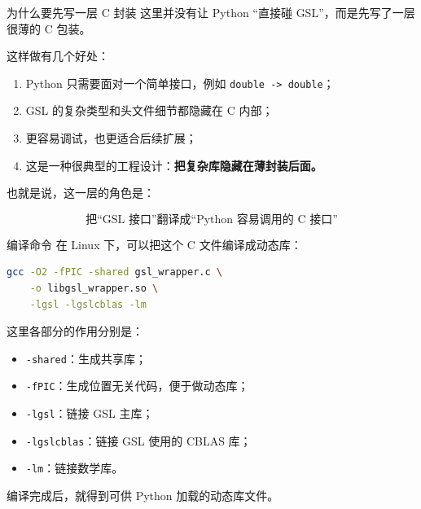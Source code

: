\documentclass[aspectratio=169,11pt]{ctexbeamer}
\begin{document}
\begin{frame}{为什么要先写一层 C 封装}
这里并没有让 Python “直接碰 GSL”，而是先写了一层很薄的 C 包装。

\vspace{0.5em}
这样做有几个好处：

\begin{enumerate}
  \item Python 只需要面对一个简单接口，例如 \texttt{double -> double}；
  \item GSL 的复杂类型和头文件细节都隐藏在 C 内部；
  \item 更容易调试，也更适合后续扩展；
  \item 这是一种很典型的工程设计：\textbf{把复杂库隐藏在薄封装后面。}
\end{enumerate}

\vspace{0.5em}
也就是说，这一层的角色是：

\[
\boxed{\text{把“GSL 接口”翻译成“Python 容易调用的 C 接口”}}
\]
\end{frame}

\begin{frame}[fragile]{编译命令}
在 Linux 下，可以把这个 C 文件编译成动态库：

\begin{lstlisting}[language=bash]
gcc -O2 -fPIC -shared gsl_wrapper.c \
    -o libgsl_wrapper.so \
    -lgsl -lgslcblas -lm
\end{lstlisting}

\vspace{0.5em}
这里各部分的作用分别是：

\begin{itemize}
  \item \texttt{-shared}：生成共享库；
  \item \texttt{-fPIC}：生成位置无关代码，便于做动态库；
  \item \texttt{-lgsl}：链接 GSL 主库；
  \item \texttt{-lgslcblas}：链接 GSL 使用的 CBLAS 库；
  \item \texttt{-lm}：链接数学库。
\end{itemize}

\vspace{0.5em}
编译完成后，就得到可供 Python 加载的动态库文件。
\end{frame}
\end{document}
